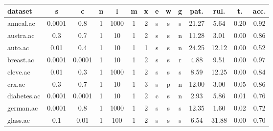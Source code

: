 \begin{table}[htbp]
	\centering
		\begin{tabular}{|l|c|c|c|c|c|c|c|c|c||c|c|c|c|}
		\hline
		\textbf{dataset}	& \textbf{s}	& \textbf{c}	& \textbf{n}	& \textbf{l}	& \textbf{m}	& \textbf{x}	& \textbf{e} & \textbf{w} & \textbf{g} & \textbf{pat.}	& \textbf{rul.}	& \textbf{t.}	& \textbf{acc.}	\\
		\hline
		anneal.ac      & 0.0001   & 0.8         & 1              & 1000                & 1             & 2             & s      & s        & s        & 21.27          & 5.64           & 0.20           & 0.92           \\
		\hline
		austra.ac      & 0.3      & 0.7         & 1              & 10                  & 1             & 2             & s      & s        & n        & 11.28          & 3.01           & 0.00           & 0.86           \\
		\hline
		auto.ac        & 0.01     & 0.4         & 1              & 10                  & 1             & 1             & s      & s        & n        & 24.25          & 12.12          & 0.00           & 0.52           \\
		\hline
		breast.ac      & 0.0001   & 0.0001      & 1              & 10                  & 1             & 2             & s      & s        & r        & 4.88           & 9.51           & 0.00           & 0.97           \\
		\hline
		cleve.ac       & 0.01     & 0.3         & 1              & 1000                & 1             & 2             & s      & s        & s        & 8.59           & 12.25          & 0.00           & 0.84           \\
		\hline
		crx.ac         & 0.3      & 0.7         & 1              & 10                  & 1             & 3             & s      & p        & n        & 12.00          & 3.00           & 0.05           & 0.86           \\
		\hline
		diabetes.ac    & 0.0001   & 0.0001      & 1              & 10                  & 1             & 2             & c      & s        & n        & 2.93           & 5.86           & 0.01           & 0.76           \\
		\hline
		german.ac      & 0.0001   & 0.8         & 1              & 1000                & 1             & 2             & s      & s        & s        & 12.35          & 1.60           & 0.02           & 0.72           \\
		\hline
		glass.ac       & 0.1      & 0.01        & 1              & 100                 & 1             & 2             & s      & s        & s        & 6.54           & 31.88          & 0.00           & 0.70           \\

\end{tabular}
\end{table}
